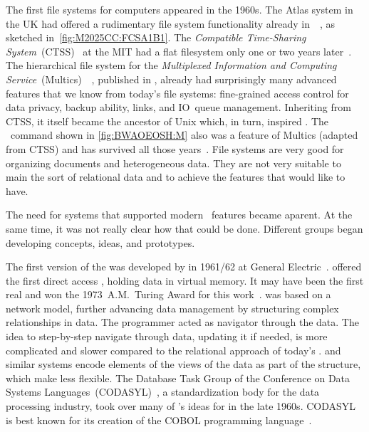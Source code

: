 The first file systems for computers appeared in the 1960s.
The Atlas system in the UK had offered a rudimentary file system functionality already in~\citeyear{KPH1961TAS}~\cite{KPH1961TAS,M2025CC:FCSA1B1}, as sketched in~\cref{fig:M2025CC:FCSA1B1}.
The  \emph{Compatible Time-Sharing System}~(CTSS)~\cite{CMDDCHOK1963TCTSSAPG} at the MIT had a flat filesystem only one or two years later~\cite{OD1963TCCSLABTCDE}.
The hierarchical file system for the \emph{Multiplexed Information and Computing Service}~(Multics)~~\cite{CV1965IAOOTMS,BWAOEOSH:M}, published in \citeyear{DN1965AGPFSFSS}, already had surprisingly many advanced features that we know from today's file systems: fine-grained access control for data privacy, backup ability, links, and IO~queue management.
Inheriting from CTSS, it itself became the ancestor of Unix which, in turn, inspired \linux.
The ~command shown in \cref{fig:BWAOEOSH:M} also was a feature of Multics (adapted from CTSS) and has survived all those years~\cite{F1999ABHOTLC}.
File systems are very good for organizing documents and heterogeneous data.
They are not very suitable to main the sort of relational data and to achieve the features that would like  to have.

The need for systems that supported modern \db\ features became aparent.
At the same time, it was not really clear how that could be done.
Different groups began developing concepts, ideas, and prototypes.

The first version of the  was developed by \citeauthor{B2009TOOTIDSITFDAD} in 1961/62 at General Electric~\cite{B2009TOOTIDSITFDAD,B1965SFRAP}.
 offered the first direct access , holding data in virtual memory.
It may have been the first real  and \citeauthor{B2009TOOTIDSITFDAD} won the 1973~A.M.~Turing Award for this work~\cite{H2016HCBITDAFOODW}.
 was based on a network model, further advancing data management by structuring complex relationships in data.
The programmer acted as navigator through the data.
The idea to step-by-step navigate through data, updating it if needed, is more complicated and slower compared to the relational approach of today's .
 and similar systems encode elements of the views of the data as part of the  structure, which make  less flexible.
The Database Task Group of the Conference on Data Systems Languages~(CODASYL)~\cite{TF1976CDBMS}, a standardization body for the data processing industry, took over many of \citeauthor{B2009TOOTIDSITFDAD}'s ideas for  in the late 1960s.
CODASYL is best known for its creation of the COBOL programming language~\cite{H2016HCBITDAFOODW}.

